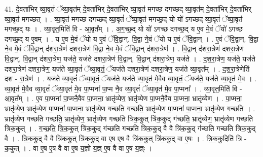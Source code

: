 \documentclass[17pt]{extarticle}
\begin{document}
41. दे॒वता॑भिर् व्या॒वृतं॑ ॅव्या॒वृत॑म् दे॒वता॑भिर् दे॒वता॑भिर् व्या॒वृत॑ मगच्छ दगच्छद् व्या॒वृत॑म् दे॒वता॑भिर् दे॒वता॑भिर् व्या॒वृत॑ मगच्छत् । . व्या॒वृत॑ मगच्छ दगच्छद् व्या॒वृतं॑ ॅव्या॒वृत॑ मगच्छ॒द् यो यो॑ ऽगच्छद् व्या॒वृतं॑ ॅव्या॒वृत॑ मगच्छ॒द् यः । . व्या॒वृत॒मिति॑ वि - आ॒वृत᳚म् । . अ॒ग॒च्छ॒द् यो यो॑ ऽगच्छ दगच्छ॒द् य ए॒व मे॒वं ॅयो॑ ऽगच्छ दगच्छ॒द् य ए॒वम् । . य ए॒व मे॒वं ॅयो य ए॒वं ॅवि॒द्वान्. वि॒द्वा ने॒वं ॅयो य ए॒वं ॅवि॒द्वान् । . ए॒वं ॅवि॒द्वान्. वि॒द्वा ने॒व मे॒वं ॅवि॒द्वान् द॑शरा॒त्रेण॑ दशरा॒त्रेण॑ वि॒द्वा ने॒व मे॒वं ॅवि॒द्वान् द॑शरा॒त्रेण॑ । . वि॒द्वान् द॑शरा॒त्रेण॑ दशरा॒त्रेण॑ वि॒द्वान्. वि॒द्वान् द॑शरा॒त्रेण॒ यज॑ते॒ यज॑ते दशरा॒त्रेण॑ वि॒द्वान्. वि॒द्वान् द॑शरा॒त्रेण॒ यज॑ते । . द॒श॒रा॒त्रेण॒ यज॑ते॒ यज॑ते दशरा॒त्रेण॑ दशरा॒त्रेण॒ यज॑ते व्या॒वृतं॑ ॅव्या॒वृतं॒ ॅयज॑ते दशरा॒त्रेण॑ दशरा॒त्रेण॒ यज॑ते व्या॒वृत᳚म् । . द॒श॒रा॒त्रेणेति॑ दश - रा॒त्रेण॑ । . यज॑ते व्या॒वृतं॑ ॅव्या॒वृतं॒ ॅयज॑ते॒ यज॑ते व्या॒वृत॑ मे॒वैव व्या॒वृतं॒ ॅयज॑ते॒ यज॑ते व्या॒वृत॑ मे॒व । . व्या॒वृत॑ मे॒वैव व्या॒वृतं॑ ॅव्या॒वृत॑ मे॒व पा॒प्मना॑ पा॒प्म नै॒व व्या॒वृतं॑ ॅव्या॒वृत॑ मे॒व पा॒प्मना᳚ । . व्या॒वृत॒मिति॑ वि - आ॒वृत᳚म् । . ए॒व पा॒प्मना॑ पा॒प्मनै॒वैव पा॒प्मना॒ भ्रातृ॑व्येण॒ भ्रातृ॑व्येण पा॒प्मनै॒वैव पा॒प्मना॒ भ्रातृ॑व्येण । . पा॒प्मना॒ भ्रातृ॑व्येण॒ भ्रातृ॑व्येण पा॒प्मना॑ पा॒प्मना॒ भ्रातृ॑व्येण गच्छति गच्छति॒ भ्रातृ॑व्येण पा॒प्मना॑ पा॒प्मना॒ भ्रातृ॑व्येण गच्छति । . भ्रातृ॑व्येण गच्छति गच्छति॒ भ्रातृ॑व्येण॒ भ्रातृ॑व्येण गच्छति त्रिक॒कुत् त्रि॑क॒कुद् ग॑च्छति॒ भ्रातृ॑व्येण॒ भ्रातृ॑व्येण गच्छति त्रिक॒कुत् । . ग॒च्छ॒ति॒ त्रि॒क॒कुत् त्रि॑क॒कुद् ग॑च्छति गच्छति त्रिक॒कुद् वै वै त्रि॑क॒कुद् ग॑च्छति गच्छति त्रिक॒कुद् वै । . त्रि॒क॒कुद् वै वै त्रि॑क॒कुत् त्रि॑क॒कुद् वा ए॒ष ए॒ष वै त्रि॑क॒कुत् त्रि॑क॒कुद् वा ए॒षः । . त्रि॒क॒कुदिति॑ त्रि - क॒कुत् । . वा ए॒ष ए॒ष वै वा ए॒ष य॒ज्ञो य॒ज्ञ् ए॒ष वै वा ए॒ष य॒ज्ञ्ः । \newline
\pagebreak
{}
\end{document}
